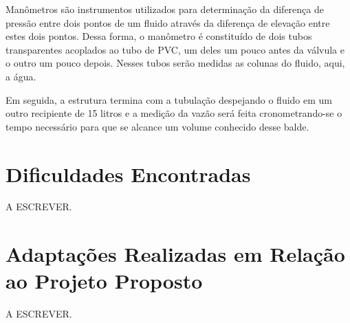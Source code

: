 Manômetros são instrumentos utilizados para determinação da diferença de 
pressão entre dois pontos de um fluido através
da diferença de elevação entre estes dois pontos. Dessa forma, o manômetro 
é constituído de dois tubos transparentes
acoplados ao tubo de PVC, um deles um pouco antes da válvula e o outro um 
pouco depois. Nesses tubos serão medidas as colunas do fluido, aqui, a água.

Em seguida, a estrutura termina com a tubulação despejando o fluido em um 
outro recipiente de 15 litros e a medição da vazão será feita cronometrando-se o
tempo necessário para que se alcance um volume conhecido desse balde.

\section{Dificuldades Encontradas}%
\label{sec:dificuldades}
A ESCREVER.

\section{Adaptações Realizadas em Relação ao Projeto Proposto}%
\label{sec:dificuldades}
A ESCREVER.

